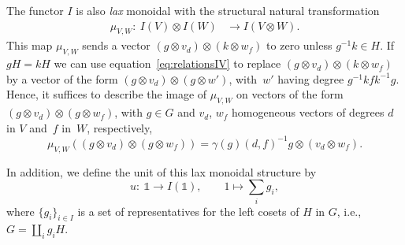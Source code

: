 \documentclass[10pt,a4paper]{amsart}
\numberwithin{equation}{section}
\newcommand{\one}{\mathds{1}}
\newcommand{\rI}{I}
\begin{document}
The functor $\rI$ is also \emph{lax} monoidal with the structural natural transformation
\begin{align*}
 \mu_{V,W}\colon\ \rI(V)\otimes \rI(W)&\to \rI(V\otimes W).
\end{align*}
This map $\mu_{V,W}$ sends a vector $(g\otimes v_d)\otimes (k\otimes w_f)$ to zero unless $g^{-1}k\in H$. If $gH=kH$ we can use equation~\eqref{eq:relationsIV} to replace
$(g\otimes v_d)\otimes (k\otimes w_f)$ by a vector of the form $(g\otimes v_d)\otimes (g\otimes w')$, with~$w'$ having degree $g^{-1}kfk^{-1}g$. Hence,
it suffices to describe the image of $\mu_{V,W}$ on vectors of the form $(g\otimes v_d)\otimes (g\otimes w_f)$, with $g\in G$ and $v_d$, $w_f$ homogeneous vectors of degrees $d$ in $V$ and~$f$ in~$W$, respectively,
\[
 \mu_{V,W}((g\otimes v_d)\otimes (g\otimes w_f))=\gamma(g)(d,f)^{-1}g\otimes (v_d\otimes w_f).
\]

In addition, we define the unit of this lax monoidal structure by
\begin{equation}\label{eq:lax-unit}
u\colon\ \one \to I(\one), \qquad 1\mapsto \sum_{i}g_i,
\end{equation}
where $\{g_i\}_{i\in I}$ is a set of representatives for the left cosets of $H$ in $G$, i.e., $G=\coprod\limits_i g_iH$.
\end{document}
